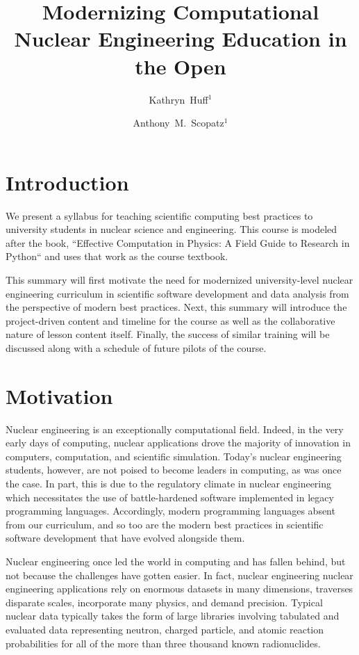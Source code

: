 \documentclass{anstrans}
\title{Modernizing Computational Nuclear Engineering Education in the Open}
\author{Kathryn~Huff$^{1}$}
\author{Anthony~M.~Scopatz$^{1}$}
\institute{
$^{1}$ The University of California -- Berkeley, Berkeley, CA 94709 \\
\and $^{2}$ The University of South Carolina, Columbia, SC 29208 \\
}
\begin{document}
\section{Introduction}

We present a syllabus for teaching scientific computing best practices to
university students in nuclear science and engineering.  This course is modeled after the
book, ``Effective Computation in Physics: A Field Guide to Research in Python``
and uses that work as the course textbook.

This summary will first motivate the need for modernized university-level nuclear
engineering curriculum in scientific software development and data analysis
from the perspective of modern best practices.  Next, this summary will introduce
the project-driven content and timeline for the course as well as the
collaborative nature of lesson content itself. Finally, the success of
similar training will be discussed along with a schedule of future pilots of
the course.

\section{Motivation}

Nuclear engineering is an exceptionally computational field. Indeed, in the very early
days of computing,  nuclear applications drove the majority of innovation
in computers, computation, and scientific simulation. Today's nuclear
engineering students, however, are not poised to become leaders in computing,
as was once the case.
In part, this is due to the regulatory climate in nuclear engineering which
necessitates the use of battle-hardened software implemented in legacy
programming languages. Accordingly, modern programming languages absent from
our curriculum, and so too are the modern
best practices in scientific software development \cite{wilson_best_2014} that
have evolved alongside them.

Nuclear engineering once led the world in computing and has fallen behind, but
not because the challenges have gotten easier. In fact, nuclear engineering
nuclear engineering applications rely on enormous datasets in many
dimensions, traverses disparate scales, incorporate many physics, and demand
precision. Typical nuclear data typically takes the form of large libraries involving
tabulated and evaluated data representing neutron, charged particle, and atomic
reaction probabilities for all of the more than three thousand known
radionuclides.
\end{document}
